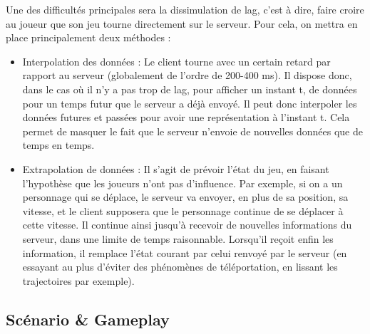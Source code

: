\documentclass[a4paper,10pt]{article}
\begin{document}
Une des difficultés principales sera la dissimulation de lag, c'est à dire, faire croire au joueur que son jeu tourne directement sur le serveur. Pour cela, on mettra en place principalement deux méthodes :
\begin{itemize}
\item Interpolation des données : Le client tourne avec un certain retard par rapport au serveur (globalement de l'ordre de 200-400 ms). Il dispose donc, dans le cas où il n'y a pas trop de lag, pour afficher un instant t, de données pour un temps futur que le serveur a déjà envoyé. Il peut donc interpoler les données futures et passées pour avoir une représentation à l'instant t. Cela permet de masquer le fait que le serveur n'envoie de nouvelles données que de temps en temps.
\item Extrapolation de données : Il s'agit de prévoir l'état du jeu, en faisant l'hypothèse que les joueurs n'ont pas d'influence. Par exemple, si on a un personnage qui se déplace, le serveur va envoyer, en plus de sa position, sa vitesse, et le client supposera que le personnage continue de se déplacer à cette vitesse. Il continue ainsi jusqu'à recevoir de nouvelles informations du serveur, dans une limite de temps raisonnable. Lorsqu'il reçoit enfin les information, il remplace l'état courant par celui renvoyé par le serveur (en essayant au plus d'éviter des phénomènes de téléportation, en lissant les trajectoires par exemple). 
\end{itemize}


\subsection{Scénario \& Gameplay}
\end{document}
